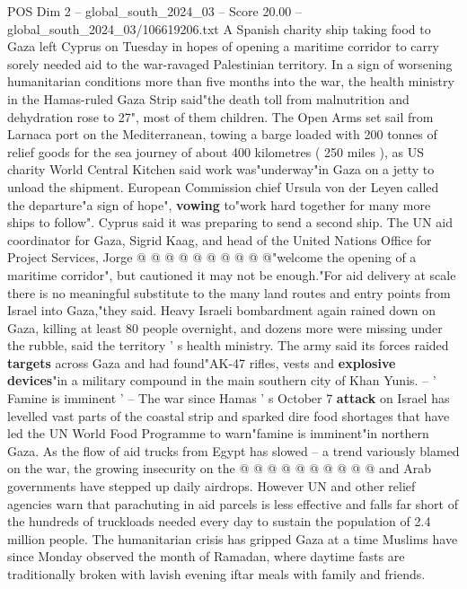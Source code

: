 \begin{textsample}{POS Dim 2 – global\_south\_2024\_03 – Score 20.00 – global\_south\_2024\_03/106619206.txt}  \label{ex:f2_pos_331}
A Spanish charity ship taking food to Gaza left Cyprus on Tuesday in hopes of opening a maritime corridor to carry sorely needed aid to the war-ravaged Palestinian territory.
In a sign of worsening humanitarian conditions more than five months into the war, the health ministry in the Hamas-ruled Gaza Strip said"the death toll from malnutrition and dehydration rose to 27", most of them children.
The Open Arms set sail from Larnaca port on the Mediterranean, towing a barge loaded with 200 tonnes of relief goods for the sea journey of about 400 kilometres ( 250 miles ), as US charity World Central Kitchen said work was"underway"in Gaza on a jetty to unload the shipment.
European Commission chief Ursula von der Leyen called the departure"a sign of hope", \textbf{vowing} to"work hard together for many more ships to follow".
Cyprus said it was preparing to send a second ship.
The UN aid coordinator for Gaza, Sigrid Kaag, and head of the United Nations Office for Project Services, Jorge @ @ @ @ @ @ @ @ @ @"welcome the opening of a maritime corridor", but cautioned it may not be enough."For aid delivery at scale there is no meaningful substitute to the many land routes and entry points from Israel into Gaza,"they said.
Heavy Israeli bombardment again rained down on Gaza, killing at least 80 people overnight, and dozens more were missing under the rubble, said the territory ' s health ministry.
The army said its forces raided \textbf{targets} across Gaza and had found"AK-47 rifles, vests and \textbf{explosive} \textbf{devices}"in a military compound in the main southern city of Khan Yunis. -- ' Famine is imminent ' -- The war since Hamas ' s October 7 \textbf{attack} on Israel has levelled vast parts of the coastal strip and sparked dire food shortages that have led the UN World Food Programme to warn"famine is imminent"in northern Gaza.
As the flow of aid trucks from Egypt has slowed -- a trend variously blamed on the war, the growing insecurity on the @ @ @ @ @ @ @ @ @ @ and Arab governments have stepped up daily airdrops.
However UN and other relief agencies warn that parachuting in aid parcels is less effective and falls far short of the hundreds of truckloads needed every day to sustain the population of 2.4 million people.
The humanitarian crisis has gripped Gaza at a time Muslims have since Monday observed the month of Ramadan, where daytime fasts are traditionally broken with lavish evening iftar meals with family and friends.

\end{textsample}
